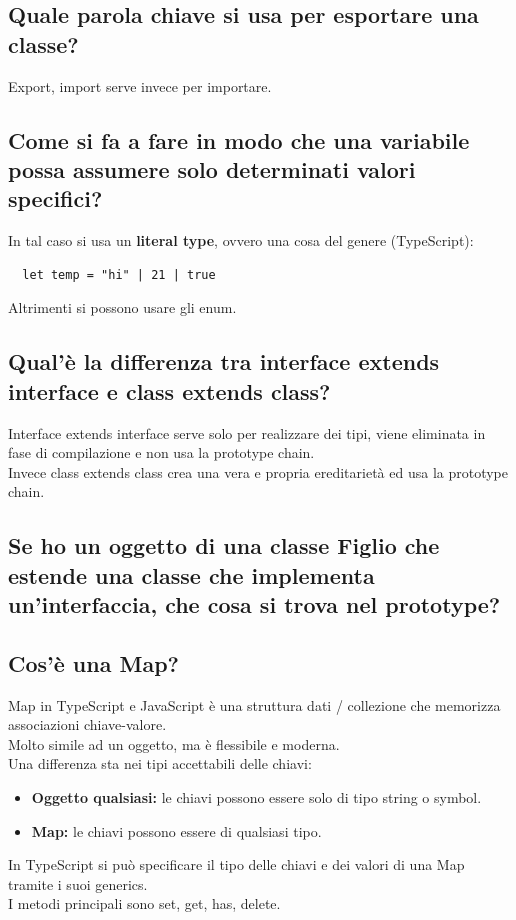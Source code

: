 \documentclass[12pt]{article}
\begin{document}
\subsection{Quale parola chiave si usa per esportare una classe?}
Export, import serve invece per importare.
\subsection{Come si fa a fare in modo che una variabile possa assumere solo determinati valori specifici?}
In tal caso si usa un \textbf{literal type}, ovvero una cosa del genere (TypeScript):
\begin{lstlisting}
  let temp = "hi" | 21 | true
\end{lstlisting}
Altrimenti si possono usare gli enum.
\subsection{Qual'è la differenza tra interface extends interface e class extends class?}
Interface extends interface serve solo per realizzare dei tipi, viene eliminata in fase di compilazione e non usa la prototype chain.\\
Invece class extends class crea una vera e propria ereditarietà ed usa la prototype chain.
\subsection{Se ho un oggetto di una classe Figlio che estende una classe che implementa un’interfaccia, che cosa si trova nel prototype?}

\subsection{Cos’è una Map?}

Map in TypeScript e JavaScript è una struttura dati / collezione che memorizza associazioni chiave-valore.\\
Molto simile ad un oggetto, ma è flessibile e moderna.\\
Una differenza sta nei tipi accettabili delle chiavi:
\begin{itemize}
  \item \textbf{Oggetto qualsiasi:} le chiavi possono essere solo di tipo string o symbol.
  \item \textbf{Map:} le chiavi possono essere di qualsiasi tipo.
\end{itemize}
In TypeScript si può specificare il tipo delle chiavi e dei valori di una Map tramite i suoi generics.\\
I metodi principali sono set, get, has, delete.
\end{document}
